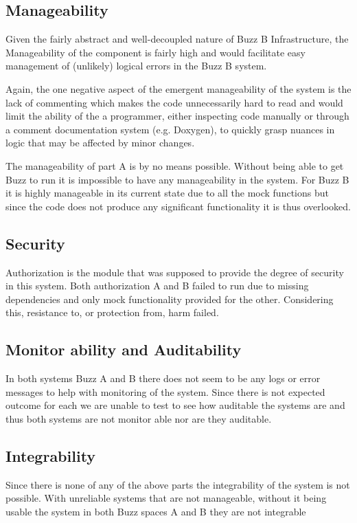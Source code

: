 \documentclass[12pt]{article}
\begin{document}
\subsection{Manageability}
Given the fairly abstract and well-decoupled nature of Buzz B Infrastructure, the Manageability of the component is fairly high and would facilitate easy management of (unlikely) logical errors in the Buzz B system. 

Again, the one negative aspect of the emergent manageability of the system is the lack of commenting which makes the code unnecessarily hard to read and would limit the ability of the a programmer, either inspecting code manually or through a comment documentation system (e.g. Doxygen), to quickly grasp nuances in logic that may be affected by minor changes.

The manageability of part A is by no means possible. Without being able to get Buzz to run it is impossible to have any manageability in the system. For Buzz B it is highly manageable in its current state due to all the mock functions but since the code does not produce any significant functionality it is thus overlooked.
\subsection{Security}
Authorization is the module that was supposed to provide the degree of security in this system. Both authorization A and B  failed to run due to missing dependencies and only mock functionality provided for the other. Considering this, resistance to, or protection from, harm failed.
\subsection{Monitor ability and Auditability}
In both systems Buzz A and B there does not seem to be any logs or error messages to help with monitoring of the system. Since there is not expected outcome for each we are unable to test to see how auditable the systems are and thus both systems are not monitor able nor are they auditable.
\subsection{Integrability}
Since there is none of any of the above parts the integrability of the system is not possible. With unreliable systems that are not manageable, without it being usable the system in both Buzz spaces A and B they are not integrable
\end{document}
